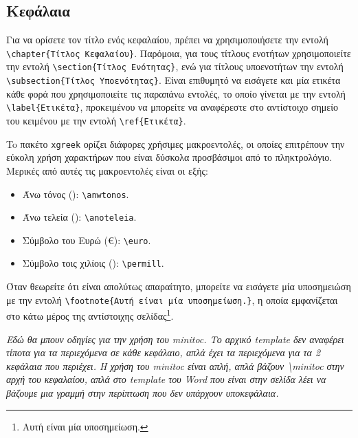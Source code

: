 \subsection{Κεφάλαια}
\label{subsec:Chapters}

Για να ορίσετε τον τίτλο ενός κεφαλαίου, πρέπει να χρησιμοποιήσετε την εντολή \verb|\chapter{Τίτλος Κεφαλαίου}|.
Παρόμοια, για τους τίτλους ενοτήτων χρησιμοποιείτε την εντολή \verb|\section{Τίτλος Ενότητας}|, ενώ για τίτλους υποενοτήτων την εντολή \verb|\subsection{Τίτλος Υποενότητας}|.
Είναι επιθυμητό να εισάγετε και μία ετικέτα κάθε φορά που χρησιμοποιείτε τις παραπάνω εντολές, το οποίο γίνεται με την εντολή \verb|\label{Ετικέτα}|, προκειμένου να μπορείτε να αναφέρεστε στο αντίστοιχο σημείο του κειμένου με την εντολή \verb|\ref{Ετικέτα}|.

To πακέτο \texttt{xgreek} ορίζει διάφορες χρήσιμες μακροεντολές, οι οποίες επιτρέπουν την εύκολη χρήση χαρακτήρων που είναι δύσκολα προσβάσιμοι από το πληκτρολόγιο.
Μερικές από αυτές τις μακροεντολές είναι οι εξής:
\begin{itemize}
	\item Άνω τόνος (\anwtonos): \verb|\anwtonos|.
	\item Άνω τελεία (\anoteleia): \verb|\anoteleia|.
	\item Σύμβολο του Ευρώ (\euro): \verb|\euro|.
	\item Σύμβολο τοις χιλίοις (\permill): \verb|\permill|.
\end{itemize}

Όταν θεωρείτε ότι είναι απολύτως απαραίτητο, μπορείτε να εισάγετε μία υποσημειώση με την εντολή \verb|\footnote{Αυτή είναι μία υποσημείωση.}|, η οποία εμφανίζεται στο κάτω μέρος της αντίστοιχης σελίδας\footnote{Αυτή είναι μία υποσημείωση.}.

{\color{red}
\textit{Εδώ θα μπουν οδηγίες για την χρήση του minitoc. Το αρχικό
template δεν αναφέρει τίποτα για τα περιεχόμενα σε κάθε κεφάλαιο,
απλά έχει τα περιεχόμενα για τα 2 κεφάλαια που περιέχει. Η χρήση
του minitoc είναι απλή, απλά βάζουν \textbackslash minitoc στην αρχή του κεφαλαίου,
απλά στο template του Word που είναι στην σελίδα λέει να βάζουμε μια
γραμμή στην περίπτωση που δεν υπάρχουν υποκεφάλαια.}}

